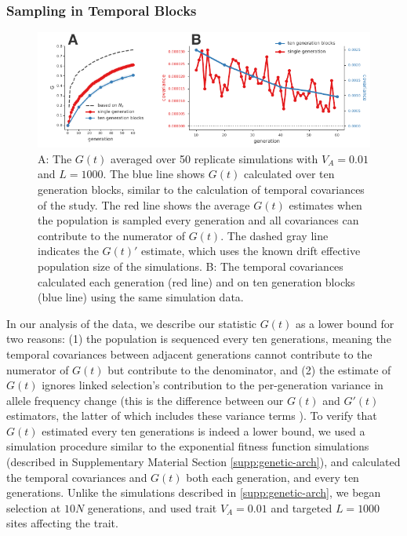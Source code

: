 \documentclass[11pt]{article}
\begin{document}
{\begin{figure}[!ht]
  \label{suppfig:convergence-corrs-gss}
\end{figure}

\subsubsection{Sampling in Temporal Blocks}
\label{supp:tempblocks}

\begin{figure}[!ht]
  \centering
  \includegraphics[width=\textwidth]{figures/fig-supp-blocks.pdf}

  \caption{A: The $G(t)$ averaged over 50 replicate simulations with $V_A =
    0.01$ and $L = 1000$. The blue line shows $G(t)$ calculated over ten
    generation blocks, similar to the calculation of temporal covariances of
    the \textcite{Barghi2019-qy} study. The red line shows the average $G(t)$
    estimates when the population is sampled every generation and all
    covariances can contribute to the numerator of $G(t)$. The dashed gray line
    indicates the $G(t)'$ estimate, which uses the known drift effective
    population size of the simulations. B: The temporal covariances calculated
    each generation (red line) and on ten generation blocks (blue line) using the
    same simulation data.}

  \label{suppfig:supp-blocks}
\end{figure}

In our analysis of the \textcite{Barghi2019-qy} data, we describe our statistic
$G(t)$ as a lower bound for two reasons: (1) the population is sequenced every
ten generations, meaning the temporal covariances between adjacent generations
cannot contribute to the numerator of $G(t)$ but contribute to the denominator,
and (2) the estimate of $G(t)$ ignores linked selection's contribution to the
per-generation variance in allele frequency change (this is the difference
between our $G(t)$ and $G'(t)$ estimators, the latter of which includes these
variance terms \parencite{Buffalo2019-io}).  To verify that $G(t)$ estimated
every ten generations is indeed a lower bound, we used a simulation procedure
similar to the exponential fitness function simulations (described in
Supplementary Material Section \ref{supp:genetic-arch}), and calculated the
temporal covariances and $G(t)$ both each generation, and every ten
generations. Unlike the simulations described in \ref{supp:genetic-arch}, we
began selection at $10N$ generations, and used trait $V_A = 0.01$ and targeted
$L = 1000$ sites affecting the trait. 

}
\end{document}
